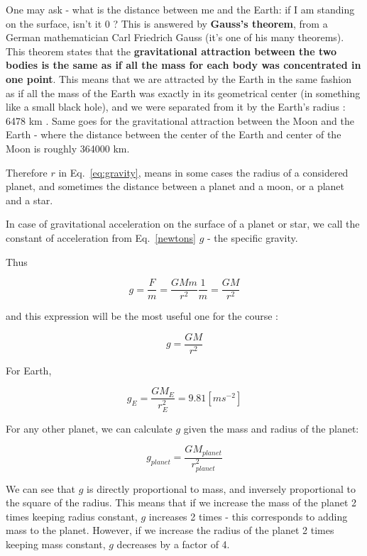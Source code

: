 \documentclass[paper=a4, fontsize=11pt]{scrartcl} %
\numberwithin{equation}{section} %
\begin{document}
One may ask - what is the distance between me and the Earth:  if I am standing on the surface, isn't it 0 ? 
This is answered by \textbf{Gauss's theorem}, from a German mathematician Carl Friedrich Gauss (it's one of his many theorems). This theorem states that the \textbf{gravitational attraction between the two bodies is the same as if all the mass for each body was concentrated in one point}. This means that we are attracted by the Earth in the same fashion as if all the mass of the Earth was exactly in its geometrical center (in something like a small black hole),  and we were separated from it by the Earth's radius : 6478 km . Same goes for the gravitational attraction between the Moon and the Earth - where the distance between the center of the Earth and center of the Moon is roughly 364000 km. 

Therefore $r$ in Eq.~\ref{eq:gravity}, means in some cases the radius of a considered planet, and sometimes the distance between a planet and a moon, or a planet and a star. 



In case of gravitational acceleration on the surface of a planet or star, we call the constant of acceleration from Eq.~\ref{newtons} $g$  - the specific gravity. 

Thus 

\begin{equation}
g = \frac{F}{m} = \frac{G M m}{r^{2}} \frac{1}{m} = \frac{GM}{r^{2}}
\end{equation}

and this expression will be the  most useful one for the course :

\begin{equation}
g = \frac{GM}{r^{2}}
\end{equation}


For Earth, 

\begin{equation}
g_{E} = \frac{GM_{E}}{r_{E}^{2}} = 9.81 [m s^{-2}]
\end{equation}

For any other planet, we can calculate $g$ given the mass and radius of the planet: 

\begin{equation}
g_{planet} = \frac{GM_{planet}}{r_{planet}^{2}}
\end{equation}





We can see that $g$ is directly proportional to mass, and inversely proportional to the square of the radius. This means that if we increase the mass of the planet 2 times keeping radius constant, $g$ increases 2 times - this corresponds to adding mass to the planet. However, if we increase the radius of the planet 2 times keeping mass constant,   $g$ decreases by a factor of 4. 
\end{document}
